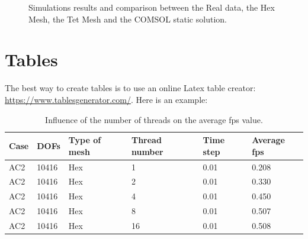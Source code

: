 \begin{figure}[htb]%
    \centering
    \qquad
    \caption{Simulations results and comparison between the Real data, the Hex Mesh, the Tet Mesh and the COMSOL static solution.}%
    \label{fig:gravity_left}%
\end{figure}

\section{Tables}\label{tables}

The best way to create tables is to use an online Latex table creator: \url{https://www.tablesgenerator.com/}. Here is an example:

\begin{table}[htp]
    \centering
    \begin{tabular}{@{}llllll@{}}
    \toprule
    Case & DOFs  & Type of mesh & Thread number & Time step & Average fps  \\ \midrule
    AC2  & 10416 & Hex          & 1             & 0.01      & 0.208 \\
    AC2  & 10416 & Hex          & 2             & 0.01      & 0.330 \\
    AC2  & 10416 & Hex          & 4             & 0.01      & 0.450 \\
    AC2  & 10416 & Hex          & 8             & 0.01      & 0.507 \\
    AC2  & 10416 & Hex          & 16            & 0.01      & 0.508 \\ \bottomrule
    \end{tabular}
    \caption{Influence of the number of threads on the average fps value.}
    \label{tab:thread_number}
\end{table}


